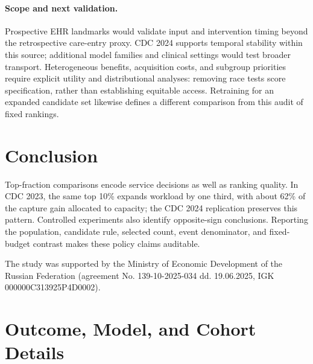 \documentclass{article}
\begin{document}
\paragraph{Scope and next validation.}
Prospective EHR landmarks would validate input and intervention timing beyond
the retrospective care-entry proxy. CDC 2024 supports temporal stability within
this source; additional model families and clinical settings would test broader
transport. Heterogeneous benefits, acquisition costs, and subgroup priorities
require explicit utility and distributional analyses: removing race tests score
specification, rather than establishing equitable access. Retraining for an
expanded candidate set likewise defines a different comparison from this audit
of fixed rankings.

\FloatBarrier

\section{Conclusion}
\label{sec:conclusion}

Top-fraction comparisons encode service decisions as well as ranking quality.
In CDC 2023, the same top 10\% expands workload by one third, with about 62\%
of the capture gain allocated to capacity; the CDC 2024 replication preserves
this pattern. Controlled experiments also identify opposite-sign conclusions.
Reporting the population, candidate rule, selected count, event denominator,
and fixed-budget contrast makes these policy claims auditable.

\begin{ack}
The study was supported by the Ministry of Economic Development of the
Russian Federation (agreement No. 139-10-2025-034 dd. 19.06.2025,
IGK 000000C313925P4D0002).
\end{ack}




\appendix

\section{Outcome, Model, and Cohort Details}
\label{app:design}
\end{document}
